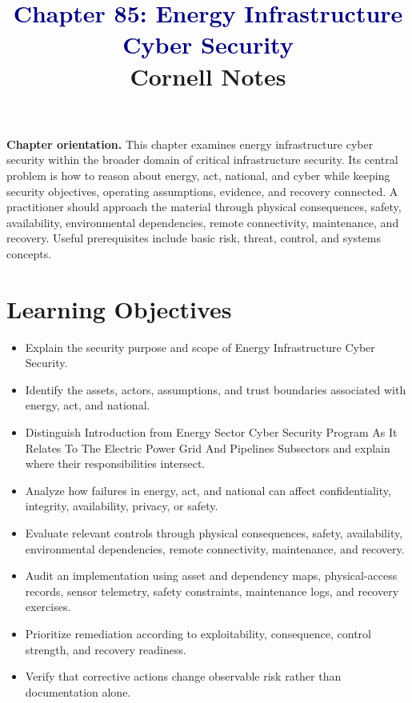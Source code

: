 \documentclass[11pt]{article}
\title{\textcolor{Navy}{Chapter 85: Energy Infrastructure Cyber Security}\\[2mm]\large Cornell Notes}
\author{}
\date{}
\begin{document}
\maketitle
\thispagestyle{fancy}
\vspace{-1.5em}
\begin{orientationbox}
\textbf{Chapter orientation.} This chapter examines energy infrastructure cyber security within the broader domain of critical infrastructure security. Its central problem is how to reason about energy, act, national, and cyber while keeping security objectives, operating assumptions, evidence, and recovery connected. A practitioner should approach the material through physical consequences, safety, availability, environmental dependencies, remote connectivity, maintenance, and recovery. Useful prerequisites include basic risk, threat, control, and systems concepts.
\end{orientationbox}
\section*{Learning Objectives}
\begin{itemize}
\item Explain the security purpose and scope of Energy Infrastructure Cyber Security.
\item Identify the assets, actors, assumptions, and trust boundaries associated with energy, act, and national.
\item Distinguish Introduction from Energy Sector Cyber Security Program As It Relates To The Electric Power Grid And Pipelines Subsectors and explain where their responsibilities intersect.
\item Analyze how failures in energy, act, and national can affect confidentiality, integrity, availability, privacy, or safety.
\item Evaluate relevant controls through physical consequences, safety, availability, environmental dependencies, remote connectivity, maintenance, and recovery.
\item Audit an implementation using asset and dependency maps, physical-access records, sensor telemetry, safety constraints, maintenance logs, and recovery exercises.
\item Prioritize remediation according to exploitability, consequence, control strength, and recovery readiness.
\item Verify that corrective actions change observable risk rather than documentation alone.
\end{itemize}
\end{document}
